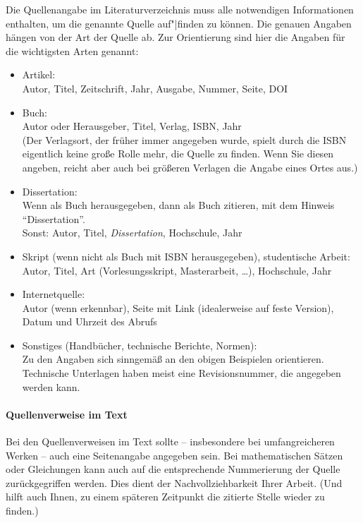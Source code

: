 Die Quellenangabe im Literaturverzeichnis muss alle notwendigen Informationen enthalten, um die genannte Quelle auf"|finden zu können.
Die genauen Angaben hängen von der Art der Quelle ab.
Zur Orientierung sind hier die Angaben für die wichtigsten Arten genannt:
\begin{itemize}
  \item Artikel:\\
    Autor, Titel, Zeitschrift, Jahr, Ausgabe, Nummer, Seite, \ggf DOI
  \item Buch:\\
    Autor oder Herausgeber, Titel, Verlag, ISBN, Jahr\\
    (Der Verlagsort, der früher immer angegeben wurde, spielt durch die ISBN eigentlich keine große Rolle mehr, die Quelle zu finden.
    Wenn Sie diesen angeben, reicht aber auch bei größeren Verlagen die Angabe eines Ortes aus.)
  \item Dissertation:\\
    Wenn als Buch herausgegeben, dann als Buch zitieren, \ggf mit dem Hinweis "`Dissertation"'.\\
    Sonst: Autor, Titel, \emph{Dissertation}, Hochschule, Jahr
  \item Skript (wenn nicht als Buch mit ISBN herausgegeben), studentische Arbeit:\\
    Autor, Titel, Art (Vorlesungsskript, Masterarbeit, \ldots), Hochschule, Jahr
  \item Internetquelle:\\
    Autor (wenn erkennbar), Seite mit Link (idealerweise auf feste Version), Datum und Uhrzeit des Abrufs
  \item Sonstiges (Handbücher, technische Berichte, Normen):\\
    Zu den Angaben sich sinngemäß an den obigen Beispielen orientieren.
    Technische Unterlagen haben meist eine Revisionsnummer, die angegeben werden kann.
\end{itemize}



\paragraph{Quellenverweise im Text}

Bei den Quellenverweisen im Text sollte -- insbesondere bei umfangreicheren Werken -- auch eine Seitenangabe angegeben sein.
Bei mathematischen Sätzen oder Gleichungen kann auch auf die entsprechende Nummerierung der Quelle zurückgegriffen werden.
Dies dient der Nachvollziehbarkeit Ihrer Arbeit.
(Und hilft auch Ihnen, zu einem späteren Zeitpunkt die zitierte Stelle wieder zu finden.)




